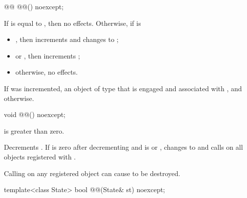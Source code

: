%
\begin{itemdecl}
@@ @@() noexcept;
\end{itemdecl}

\begin{itemdescr}
\pnum
\effects
If  is equal to , then no effects.
Otherwise, if  is
\begin{itemize}
\item
{},
then increments  and changes  to ;
\item
{} or ,
then increments ;
\item
otherwise, no effects.
\end{itemize}

\pnum
\returns
If  was incremented,
an object of type 
that is engaged and associated with , and
 otherwise.
\end{itemdescr}

%
\begin{itemdecl}
void @@() noexcept;
\end{itemdecl}

\begin{itemdescr}
\pnum
\expects
{} is greater than zero.

\pnum
\effects
Decrements .
If  is zero after decrementing and
 is  or ,
changes  to  and
calls  on all objects registered with .
\begin{note}
Calling  on any registered object
can cause  to be destroyed.
\end{note}
\end{itemdescr}

%
\begin{itemdecl}
template<class State>
  bool @@(State& st) noexcept;
\end{itemdecl}

